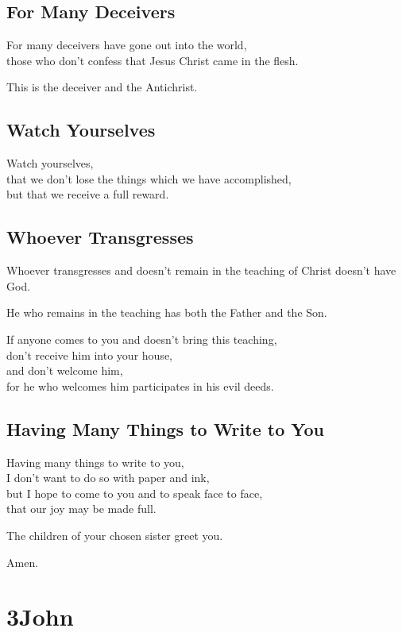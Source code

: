 \documentclass[twoside, openany, 12pt]{extbook}
\begin{document}
\newpage\section{For Many Deceivers}

For many deceivers have gone out into the world,
\\
those who don’t confess that Jesus Christ came in the flesh.

This is the deceiver and the Antichrist.

\newpage\section{Watch Yourselves}

Watch yourselves,
\\
that we don’t lose the things which we have accomplished,
\\
but that we receive a full reward.

\newpage\section{Whoever Transgresses}

Whoever transgresses and doesn’t remain in the teaching of Christ doesn’t have God.

He who remains in the teaching has both the Father and the Son.

If anyone comes to you and doesn’t bring this teaching,
\\
don’t receive him into your house,
\\
and don’t welcome him,
\\
for he who welcomes him participates in his evil deeds.

\newpage\section{Having Many Things to Write to You}

Having many things to write to you,
\\
I don’t want to do so with paper and ink,
\\
but I hope to come to you and to speak face to face,
\\
that our joy may be made full.

The children of your chosen sister greet you.

Amen.
\chapter{3John}
\end{document}
